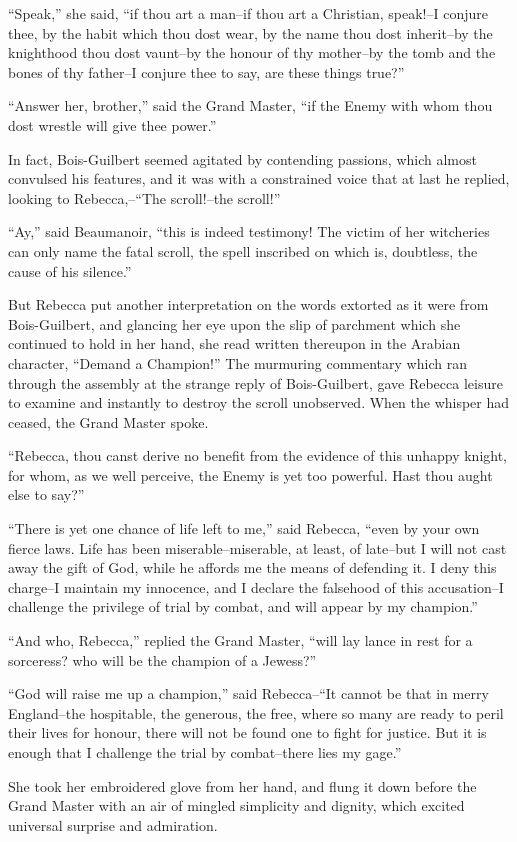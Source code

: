 ``Speak,'' she said, ``if thou art a man--if thou art a Christian,
speak!--I conjure thee, by the habit which thou dost wear, by the name
thou dost inherit--by the knighthood thou dost vaunt--by the honour of
thy mother--by the tomb and the bones of thy father--I conjure thee to
say, are these things true?''

``Answer her, brother,'' said the Grand Master, ``if the Enemy with whom
thou dost wrestle will give thee power.''

In fact, Bois-Guilbert seemed agitated by contending passions, which
almost convulsed his features, and it was with a constrained voice that
at last he replied, looking to Rebecca,--``The scroll!--the scroll!''

``Ay,'' said Beaumanoir, ``this is indeed testimony! The victim of her
witcheries can only name the fatal scroll, the spell inscribed on which
is, doubtless, the cause of his silence.''

But Rebecca put another interpretation on the words extorted as it were
from Bois-Guilbert, and glancing her eye upon the slip of parchment
which she continued to hold in her hand, she read written thereupon in
the Arabian character, ``Demand a Champion!'' The murmuring commentary
which ran through the assembly at the strange reply of Bois-Guilbert,
gave Rebecca leisure to examine and instantly to destroy the scroll
unobserved. When the whisper had ceased, the Grand Master spoke.

``Rebecca, thou canst derive no benefit from the evidence of this
unhappy knight, for whom, as we well perceive, the Enemy is yet too
powerful. Hast thou aught else to say?''

``There is yet one chance of life left to me,'' said Rebecca, ``even by
your own fierce laws. Life has been miserable--miserable, at least, of
late--but I will not cast away the gift of God, while he affords me the
means of defending it. I deny this charge--I maintain my innocence, and
I declare the falsehood of this accusation--I challenge the privilege of
trial by combat, and will appear by my champion.''

``And who, Rebecca,'' replied the Grand Master, ``will lay lance in rest
for a sorceress? who will be the champion of a Jewess?''

``God will raise me up a champion,'' said Rebecca--``It cannot be that
in merry England--the hospitable, the generous, the free, where so many
are ready to peril their lives for honour, there will not be found one
to fight for justice. But it is enough that I challenge the trial by
combat--there lies my gage.''

She took her embroidered glove from her hand, and flung it down before
the Grand Master with an air of mingled simplicity and dignity, which
excited universal surprise and admiration.
